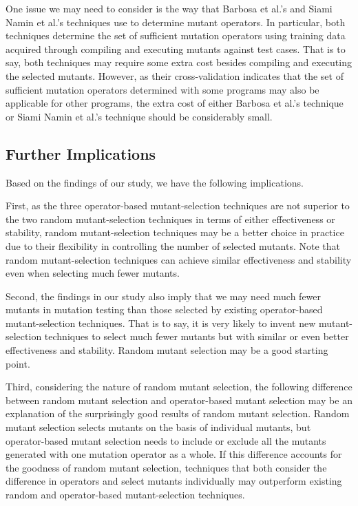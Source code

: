 One issue we may need to consider is the way that Barbosa et al.'s
and Siami Namin et al.'s techniques use to determine mutant
operators. In particular, both techniques determine the set of
sufficient mutation operators using training data acquired through
compiling and executing mutants against test cases. That is to
say, both techniques may require some extra cost besides compiling
and executing the selected mutants. However, as their
cross-validation indicates that the set of sufficient mutation
operators determined with some programs may also be applicable for
other programs, the extra cost of either Barbosa et al.'s
technique or Siami Namin et al.'s technique should be considerably
small.

\vspace{-1.5ex}
\subsection{Further Implications}
\label{Implications}

Based on the findings of our study, we have the following
implications.

First, as the three operator-based mutant-selection techniques are
not superior to the two random mutant-selection techniques in
terms of either effectiveness or stability, random
mutant-selection techniques may be a better choice in practice due
to their flexibility in controlling the number of selected
mutants. Note that random mutant-selection techniques can achieve
similar effectiveness and stability even when selecting much fewer
mutants.

Second, the findings in our study also imply that we may need much
fewer mutants in mutation testing than those selected by existing
operator-based mutant-selection techniques. That is to say, it is
very likely to invent new mutant-selection techniques to select
much fewer mutants but with similar or even better effectiveness
and stability. Random mutant selection may be a good starting
point.

Third, considering the nature of random mutant selection, the
following difference between random mutant selection and
operator-based mutant selection may be an explanation of the
surprisingly good results of random mutant selection. Random
mutant selection selects mutants on the basis of individual
mutants, but operator-based mutant selection needs to include or
exclude all the mutants generated with one mutation operator as a
whole. If this difference accounts for the goodness of random
mutant selection, techniques that both consider the difference in
operators and select mutants individually may outperform existing
random and operator-based mutant-selection techniques.
